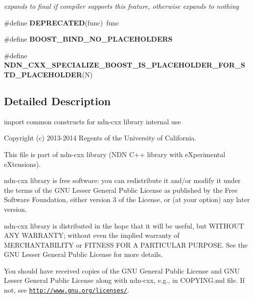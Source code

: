 \begin{DoxyCompactItemize}
\begin{DoxyCompactList}\small\item\em expands to \textquotesingle{}final\textquotesingle{} if compiler supports this feature, otherwise expands to nothing \end{DoxyCompactList}\item 
\#define {\bfseries D\+E\+P\+R\+E\+C\+A\+T\+ED}(func)~func\hypertarget{ndn-cxx_2src_2common_8hpp_aaf225a2b96038de3a42d61a1fa63654b}{}\label{ndn-cxx_2src_2common_8hpp_aaf225a2b96038de3a42d61a1fa63654b}

\item 
\#define {\bfseries B\+O\+O\+S\+T\+\_\+\+B\+I\+N\+D\+\_\+\+N\+O\+\_\+\+P\+L\+A\+C\+E\+H\+O\+L\+D\+E\+RS}\hypertarget{ndn-cxx_2src_2common_8hpp_a588de13296d14a22e2bf719e1b0012ab}{}\label{ndn-cxx_2src_2common_8hpp_a588de13296d14a22e2bf719e1b0012ab}

\item 
\#define {\bfseries N\+D\+N\+\_\+\+C\+X\+X\+\_\+\+S\+P\+E\+C\+I\+A\+L\+I\+Z\+E\+\_\+\+B\+O\+O\+S\+T\+\_\+\+I\+S\+\_\+\+P\+L\+A\+C\+E\+H\+O\+L\+D\+E\+R\+\_\+\+F\+O\+R\+\_\+\+S\+T\+D\+\_\+\+P\+L\+A\+C\+E\+H\+O\+L\+D\+ER}(N)
\end{DoxyCompactItemize}


\subsection{Detailed Description}
import common constructs for ndn-\/cxx library internal use 

Copyright (c) 2013-\/2014 Regents of the University of California.

This file is part of ndn-\/cxx library (N\+DN C++ library with e\+Xperimental e\+Xtensions).

ndn-\/cxx library is free software\+: you can redistribute it and/or modify it under the terms of the G\+NU Lesser General Public License as published by the Free Software Foundation, either version 3 of the License, or (at your option) any later version.

ndn-\/cxx library is distributed in the hope that it will be useful, but W\+I\+T\+H\+O\+UT A\+NY W\+A\+R\+R\+A\+N\+TY; without even the implied warranty of M\+E\+R\+C\+H\+A\+N\+T\+A\+B\+I\+L\+I\+TY or F\+I\+T\+N\+E\+SS F\+OR A P\+A\+R\+T\+I\+C\+U\+L\+AR P\+U\+R\+P\+O\+SE. See the G\+NU Lesser General Public License for more details.

You should have received copies of the G\+NU General Public License and G\+NU Lesser General Public License along with ndn-\/cxx, e.\+g., in C\+O\+P\+Y\+I\+N\+G.\+md file. If not, see \href{http://www.gnu.org/licenses/}{\tt http\+://www.\+gnu.\+org/licenses/}.

